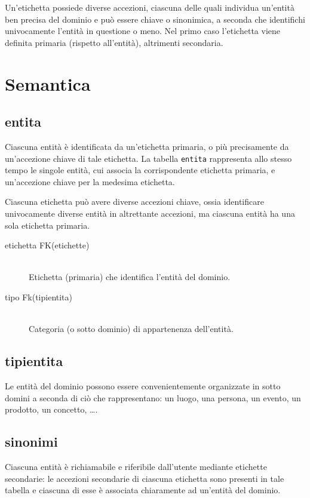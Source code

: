 \documentclass[10pt,a4paper,headinclude,footinclude,hidelinks]{scrreprt} %
\begin{document}
	Un'etichetta possiede diverse accezioni, ciascuna delle quali individua un'entità ben precisa del dominio e può essere chiave o sinonimica, a seconda che identifichi univocamente l'entità in questione o meno. Nel primo caso l'etichetta viene definita primaria (rispetto all'entità), altrimenti secondaria.
	
	\section{Semantica}
	\subsection{entita}
	Ciascuna entità è identificata da un'etichetta primaria, o più precisamente da un'accezione chiave di tale etichetta. La tabella \texttt{entita} rappresenta allo stesso tempo le singole entità, cui associa la corrispondente etichetta primaria, e un'accezione chiave per la medesima etichetta.

	Ciascuna etichetta può avere diverse accezioni chiave, ossia identificare univocamente diverse entità in altrettante accezioni, ma ciascuna entità ha una sola etichetta primaria.

	\begin{description}
	\item[etichetta FK(etichette)] \hfill \\
	Etichetta (primaria) che identifica l'entità del dominio.
	\item[tipo Fk(tipi\textunderscore entita)] \hfill \\
	Categoria (o sotto dominio) di appartenenza dell'entità.
	\end{description}

	\subsection{tipi\textunderscore entita}
	Le entità del dominio possono essere convenientemente organizzate in sotto domini a seconda di ciò che rappresentano: un luogo, una persona, un evento, un prodotto, un concetto, \ldots. 

	\subsection{sinonimi}
	Ciascuna entità è richiamabile e riferibile dall'utente mediante etichette secondarie: le accezioni secondarie di ciascuna etichetta sono presenti in tale tabella e ciascuna di esse è associata chiaramente ad un'entità del dominio.
\end{document}
